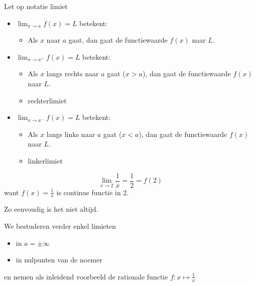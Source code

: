 \documentclass{beamer}
\begin{document}
\begin{frame}{Let op notatie limiet}

\begin{itemize}
\item $\displaystyle{\lim_{x \rightarrow a}} f(x) = L $ betekent: 
\begin{itemize}
	\item[] Als $x$
naar $a$ gaat, dan gaat de functiewaarde $f(x)$ naar $L$.
\end{itemize}

\item $\displaystyle{\lim_{x  \rightarrow a^+}} f(x) = L $ betekent: 
\begin{itemize}
	\item[] Als $x$ langs rechts
naar $a$ gaat ($x>a$), dan gaat de functiewaarde $f(x)$ naar $L$.
\item[] rechterlimiet
\end{itemize}

\item $\displaystyle{\lim_{x  \rightarrow a^-}} f(x) = L $ betekent:
\begin{itemize}
	\item[] Als $x$ langs links
naar $a$ gaat ($x<a$), dan gaat de functiewaarde $f(x)$ naar $L$.
\item[] linkerlimiet
\end{itemize}
 
\end{itemize}
\end{frame}

\begin{frame}

$$\displaystyle{\lim_{x \rightarrow 2}} \frac{1}{x} = \frac12 = f(2) $$
want $f(x)= \frac{1}{x}$ is continue functie in 2. 

Zo eenvoudig is het niet altijd.


We bestuderen verder enkel limieten 
\begin{itemize}
	\item in $a = \pm \infty$
	\item in nulpunten van de noemer
\end{itemize}
en nemen als inleidend voorbeeld de rationale functie $f : x \mapsto \frac 1x$
\end{frame}
\end{document}
